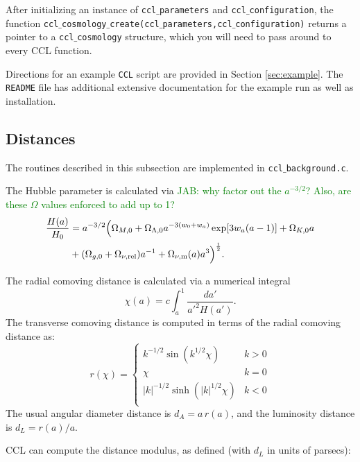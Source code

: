 \documentclass[\docopts]{\docclass}
\newcommand{\jab}[1]{\textcolor{green}{JAB: #1}}
\begin{document}
After initializing an instance of {\tt ccl$\_$parameters} and {\tt ccl$\_$configuration}, the function {\tt ccl$\_$cosmology$\_$create(ccl$\_$parameters,ccl$\_$configuration)} returns a pointer to a {\tt ccl$\_$cosmology} structure, which you will need to pass around to every CCL function.

Directions for an example {\tt CCL} script are provided in Section \ref{sec:example}. The {\tt README} file has additional extensive documentation for the example run as well as installation.

\subsection{Distances}
\label{sec:distances}

The routines described in this subsection are implemented in {\tt ccl$\_$background.c}.

The Hubble parameter is calculated via \jab{why factor out the $a^{-3/2}$? Also, are these $\Omega$ values enforced to add up to 1?}
%
\begin{align}\label{eq:Ha}
\frac{H(a)}{H_0} &= a^{-3/2}\Big(\Omega_{M,0}+\Omega_{\Lambda,0} a^{-3(w_0+w_a)}
    \exp[3 w_a (a-1)]+\Omega_{K,0} a \nonumber \\ &+(\Omega_{g,0} + \Omega_{\nu, {\rm rel}}) a^{-1} + \Omega_{\nu, {\rm m}}(a)a^3\Big)^{\frac{1}{2}}.
\end{align}

The radial comoving distance is calculated via a numerical integral
\begin{equation}
 \chi(a)= c \int_a^1 \frac{da'}{a'^2 H(a')}.
\end{equation}
The transverse comoving distance is computed in terms of the radial comoving distance as:
\begin{equation}\label{eq:angdist}
 r(\chi)=\left\{\begin{array}{cc}
                 k^{-1/2}\sin(k^{1/2}\chi) & k>0\\
                 \chi & k=0\\
                 |k|^{-1/2}\sinh(|k|^{1/2}\chi) & k<0\\
                \end{array}\right.
\end{equation}
The usual angular diameter distance is $d_A=a\,r(a)$, and the luminosity distance is
$d_L=r(a)/a$.

CCL can compute the distance modulus, as defined (with $d_L$ in units of parsecs):
\end{document}
